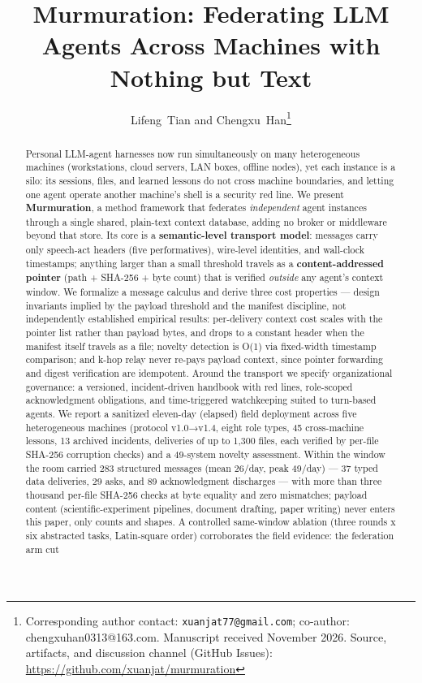 \documentclass[journal]{IEEEtran}
\begin{document}
\title{Murmuration: Federating LLM Agents Across Machines with Nothing but Text}

\author{Lifeng~Tian and Chengxu~Han\thanks{Corresponding author contact: \texttt{xuanjat77@gmail.com}; co-author: chengxuhan0313@163.com. Manuscript received November 2026. Source, artifacts, and discussion channel (GitHub Issues): \url{https://github.com/xuanjat/murmuration}}}


\maketitle

\begin{abstract}
Personal LLM-agent harnesses now run simultaneously on many heterogeneous machines (workstations, cloud servers, LAN boxes, offline nodes), yet each instance is a silo: its sessions, files, and learned lessons do not cross machine boundaries, and letting one agent operate another machine's shell is a security red line. We present \textbf{Murmuration}, a method framework that federates \emph{independent} agent instances through a single shared, plain-text context database, adding no broker or middleware beyond that store. Its core is a \textbf{semantic-level transport model}: messages carry only speech-act headers (five performatives), wire-level identities, and wall-clock timestamps; anything larger than a small threshold travels as a \textbf{content-addressed pointer} (path + SHA-256 + byte count) that is verified \emph{outside} any agent's context window. We formalize a message calculus and derive three cost properties --- design invariants implied by the payload threshold and the manifest discipline, not independently established empirical results: per-delivery context cost scales with the pointer list rather than payload bytes, and drops to a constant header when the manifest itself travels as a file; novelty detection is O(1) via fixed-width timestamp comparison; and k-hop relay never re-pays payload context, since pointer forwarding and digest verification are idempotent. Around the transport we specify organizational governance: a versioned, incident-driven handbook with red lines, role-scoped acknowledgment obligations, and time-triggered watchkeeping suited to turn-based agents. We report a sanitized eleven-day (elapsed) field deployment across five heterogeneous machines (protocol v1.0→v1.4, eight role types, 45 cross-machine lessons, 13 archived incidents, deliveries of up to 1,300 files, each verified by per-file SHA-256 corruption checks) and a 49-system novelty assessment. Within the window the room carried 283 structured messages (mean 26/day, peak 49/day) --- 37 typed data deliveries, 29 asks, and 89 acknowledgment discharges --- with more than three thousand per-file SHA-256 checks at byte equality and zero mismatches; payload content (scientific-experiment pipelines, document drafting, paper writing) never enters this paper, only counts and shapes. A controlled same-window ablation (three rounds x six abstracted tasks, Latin-square order) corroborates the field evidence: the federation arm cut 
\end{abstract}
\end{document}

